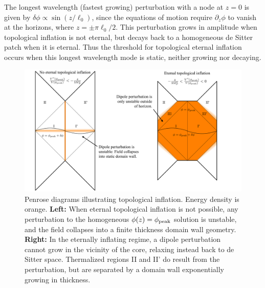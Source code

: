 \documentclass[aps,amsfonts,amsmath,prd,preprint,nofootinbib,superscriptaddress]{revtex4}
\begin{document}
\begin{appendix}
The longest wavelength (fastest growing) perturbation with a
node at $z=0$ is given by $\delta\phi \propto \sin(z/\ell_0)$, since the equations of motion require $\partial_z\phi$ to vanish at the horizons, where $z = \pm \pi \ell_0/2$.
This perturbation grows in amplitude when topological inflation is not eternal, but decays back to a homogeneous de Sitter patch when it is eternal.
Thus the threshold for topological eternal inflation occurs when this longest wavelength mode is static, neither growing nor decaying.


\begin{figure}[htbp]
\begin{center}
\includegraphics[width=1\textwidth]{figures/TEI}
\caption{Penrose diagrams illustrating topological inflation.  Energy density is orange.  {\bf Left:} When eternal topological inflation is not possible, any perturbation to the homogeneous $\phi(z) = \phi_{\rm peak}$ solution is unstable, and the field collapses into a finite thickness domain wall geometry.
{\bf Right:}  In the eternally inflating regime, a dipole perturbation cannot grow in the vicinity of the core, relaxing instead back to de Sitter space.  Thermalized regions II and II' do result from the perturbation, but are separated by a domain wall exponentially growing in thickness.}
\label{fig:TEI}
\end{center}
\end{figure}





\end{appendix}
\end{document}
